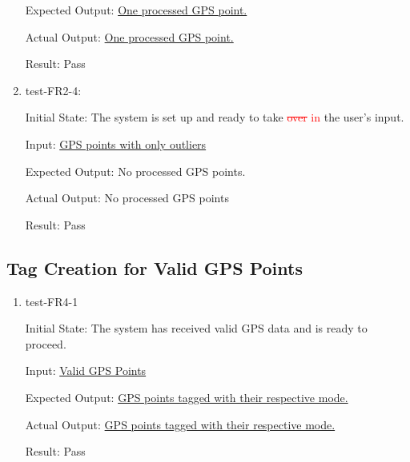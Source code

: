 \documentclass[12pt, titlepage]{article}
\begin{document}
\begin{enumerate}
    Expected Output: \href{https://github.com/paezha/PyERT-BLACK/blob/rev0-test/test/test_data/fr-tests/fr2-3-expected.csv}{One processed GPS point.}
    
    Actual Output: \href{https://github.com/paezha/PyERT-BLACK/blob/rev0-test/test/test_data/fr-tests/fr2-3-out.csv}{One processed GPS point.}
    
    Result: Pass
    \item test-FR2-4:\label{test-FR2-4}
    
    Initial State: The system is set up and ready to take \textcolor{red}{\sout{over} in} the user's input.
    
    Input: \href{https://github.com/paezha/PyERT-BLACK/blob/rev0-test/quarto-example/data/sample-gps/sample-gps-8.csv}{GPS points with only outliers}
    
    Expected Output: No processed GPS points.
    
    Actual Output: No processed GPS points
    
    Result: Pass
\end{enumerate}

\subsection{Tag Creation for Valid GPS Points}
\begin{enumerate}
    \item test-FR4-1\label{test-FR4-1}
    
    Initial State: The system has received valid GPS data and is ready to proceed.
    
    Input: \href{https://github.com/paezha/PyERT-BLACK/blob/rev0-test/quarto-example/data/sample-gps/sample-gps-1.csv}{Valid GPS Points}
    
    Expected Output: \href{https://github.com/paezha/PyERT-BLACK/blob/rev0-test/test/test_data/fr-tests/fr4-1-expected.csv}{GPS points tagged with their respective mode.}
    
    Actual Output: \href{https://github.com/paezha/PyERT-BLACK/blob/rev0-test/test/test_data/fr-tests/fr4-1-out.csv}{GPS points tagged with their respective mode.}
    
    Result: Pass
\end{enumerate}
\end{document}
